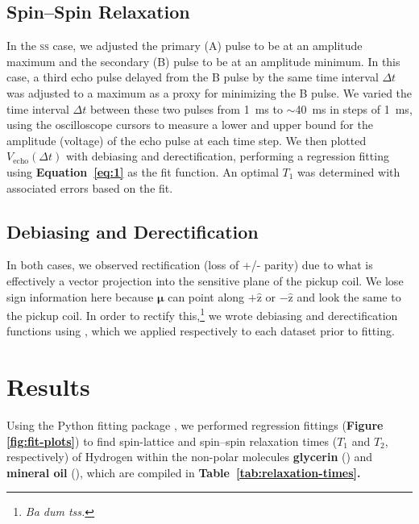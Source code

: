 \documentclass[12pt]{report}
\begin{document}
{    \subsection*{Spin–Spin Relaxation}
    {
        In the \textsc{ss} case, we adjusted the primary (A) pulse to be at an amplitude maximum and the secondary (B) pulse to be at an amplitude minimum. In this case, a third echo pulse delayed from the B pulse by the same time interval $\Delta t$ was adjusted to a maximum as a proxy for minimizing the B pulse. We varied the time interval $\Delta t$ between these two pulses from \SI{1}{\milli\second} to $\sim$\SI{40}{\milli\second} in steps of \SI{1}{\milli\second}, using the oscilloscope cursors to measure a lower and upper bound for the amplitude (voltage) of the echo pulse at each time step. We then plotted $V_{\mathrm{echo}}(\Delta t)$ with debiasing and derectification, performing a regression fitting using \textbf{Equation~\ref{eq:1}} as the fit function. An optimal $T_1$ was determined with associated errors based on the fit.
    }

    \subsection*{Debiasing and Derectification}
    {
        In both cases, we observed rectification (loss of +/- parity) due to what is effectively a vector projection into the sensitive plane of the pickup coil. We lose sign information here because $\bm{\mu}$ can point along $+\hat{\mathrm{z}}$ or $-\hat{\mathrm{z}}$ and look the same to the pickup coil. In order to rectify this,\footnote{\textit{Ba dum tss.}} we wrote debiasing and derectification functions using , which we applied respectively to each dataset prior to fitting.
    }
}

\section*{Results}
{
    Using the Python fitting package , we performed regression fittings (\textbf{Figure~ \ref{fig:fit-plots}}) to find spin-lattice and spin–spin relaxation times ($T_1$ and $T_2$, respectively) of Hydrogen within the non-polar molecules \textbf{glycerin} () and \textbf{mineral oil} (), which are compiled in \textbf{Table\ \ref{tab:relaxation-times}.} 
}
\end{document}
